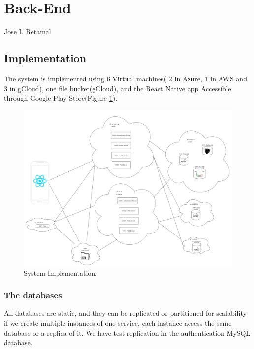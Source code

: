 \section{Back-End}
Jose I. Retamal
\vskip 0.1in
\indent
\indent

\subsection{Implementation}


The system is implemented using  6 Virtual machines( 2 in Azure, 1 in  AWS and 3 in gCloud), one file bucket(gCloud), and the React Native app Accessible through Google Play Store(Figure \ref{se:implementation}).

\begin{figure}[]
	\begin{center}
		\includegraphics[width=120mm,scale=1]{img/implementation/VM-Diagram.png}
		\caption{System Implementation.}
		\label{se:implementation}
	\end{center}
	
\end{figure}

\subsubsection{The databases}

All databases are static, and they can be replicated or partitioned for scalability if we create multiple instances of one service, each instance access the same database or a replica of it. We have test replication in the authentication MySQL database. 





